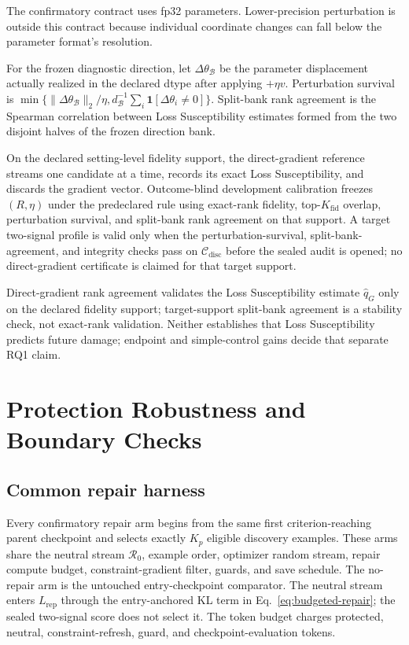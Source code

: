 The confirmatory contract uses fp32 parameters. Lower-precision perturbation is
outside this contract because individual coordinate changes can fall below the
parameter format's resolution.

For the frozen diagnostic direction, let $\Delta\theta_{\mathcal B}$ be the
parameter displacement actually realized in the declared dtype after applying
$+\eta v$. Perturbation survival is
$\min\{\|\Delta\theta_{\mathcal B}\|_2/\eta,
d_{\mathcal B}^{-1}\sum_i\mathbf 1[\Delta\theta_i\ne0]\}$.
Split-bank rank agreement is the Spearman correlation between Loss
Susceptibility estimates formed from the two disjoint halves of the frozen
direction bank.

On the declared setting-level fidelity support, the direct-gradient reference
streams one candidate at a time, records its exact Loss Susceptibility, and
discards the gradient vector. Outcome-blind development
calibration freezes $(R,\eta)$ under the predeclared rule using exact-rank
fidelity, top-$K_{\mathrm{fid}}$ overlap, perturbation survival, and split-bank
rank agreement on that support. A target two-signal profile is valid only when
the perturbation-survival, split-bank-agreement, and integrity checks pass on
$\mathcal C_{\mathrm{disc}}$ before the sealed audit is opened; no
direct-gradient certificate is claimed for that target support.
\label{app:fidelity-gate}



Direct-gradient rank agreement validates the Loss Susceptibility estimate
$\widehat q_G$ only on the declared fidelity support; target-support
split-bank agreement is a stability check, not exact-rank validation. Neither
establishes that Loss Susceptibility predicts future damage;
endpoint and simple-control gains decide that separate RQ1 claim.

\FloatBarrier

\section{Protection Robustness and Boundary Checks}
\label{app:protection-supp}
\label{app:protection-details}

\subsection{Common repair harness}
\label{app:guard-proof}
\label{app:repair-protocol}

Every confirmatory repair arm begins from the same first criterion-reaching
parent checkpoint and selects exactly $K_p$ eligible discovery examples. These
arms share the neutral stream $\mathcal R_0$, example order, optimizer random
stream, repair compute budget, constraint-gradient filter, guards, and save
schedule. The no-repair arm is the untouched entry-checkpoint comparator.
The neutral stream enters $L_{\mathrm{rep}}$ through the entry-anchored KL term in
Eq.~\eqref{eq:budgeted-repair}; the sealed two-signal score does not select it.
The token
budget charges protected, neutral, constraint-refresh, guard, and
checkpoint-evaluation tokens.

